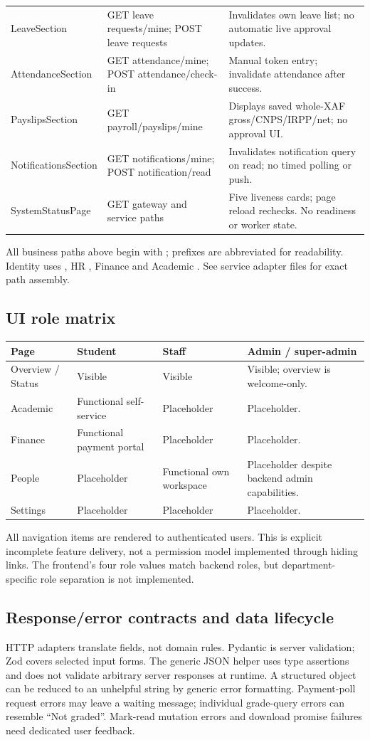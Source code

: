 \documentclass[10pt,a4paper]{article}
\begin{document}
\begin{longtable}{@{}L{31mm}L{64mm}L{65mm}@{}}
LeaveSection & GET leave requests/mine; POST leave requests & Invalidates own leave list; no automatic live approval updates.\\
AttendanceSection & GET attendance/mine; POST attendance/check-in & Manual token entry; invalidate attendance after success.\\
PayslipsSection & GET payroll/payslips/mine & Displays saved whole-XAF gross/CNPS/IRPP/net; no approval UI.\\
NotificationsSection & GET notifications/mine; POST notification/read & Invalidates notification query on read; no timed polling or push.\\
SystemStatusPage & GET gateway and service  paths & Five liveness cards; page reload rechecks. No readiness or worker state.\\
\end{longtable}\normalsize
All business paths above begin with ; prefixes are abbreviated for
readability. Identity uses , HR , Finance 
and Academic . See service adapter files for exact path assembly.

\subsection{UI role matrix}
\begin{tabularx}{\textwidth}{@{}L{31mm}L{26mm}L{26mm}Y@{}}
\toprule Page & Student & Staff & Admin / super-admin\\\midrule
Overview / Status & Visible & Visible & Visible; overview is welcome-only.\\
Academic & Functional self-service & Placeholder & Placeholder.\\
Finance & Functional payment portal & Placeholder & Placeholder.\\
People & Placeholder & Functional own workspace & Placeholder despite backend admin capabilities.\\
Settings & Placeholder & Placeholder & Placeholder.\\
\bottomrule
\end{tabularx}
All navigation items are rendered to authenticated users. This is explicit incomplete
feature delivery, not a permission model implemented through hiding links.
The frontend's four role values match backend roles, but department-specific
role separation is not implemented.

\subsection{Response/error contracts and data lifecycle}
HTTP adapters translate fields, not domain rules. Pydantic is server validation;
Zod covers selected input forms. The generic JSON helper uses type assertions and
does not validate arbitrary server responses at runtime. A structured 
object can be reduced to an unhelpful string by generic error formatting.
Payment-poll request errors may leave a waiting message; individual grade-query
errors can resemble ``Not graded''. Mark-read mutation errors and download promise
failures need dedicated user feedback.
\end{document}
